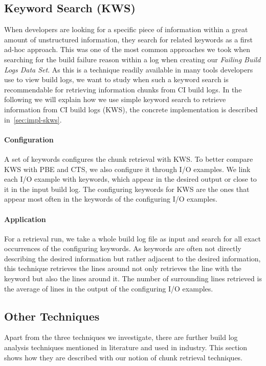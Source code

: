 \documentclass[\myrootdir/main.tex]{subfiles}
\begin{document}
\subsection{Keyword Search (KWS)}
\label{sec:expl-skws}
When developers are looking for a specific piece of information within a great amount of unstructured information, they search for related keywords as a first ad-hoc approach.
This was one of the most common approaches we took when searching for the build failure reason within a log when creating our \emph{Failing Build Logs Data Set}.
As this is a technique readily available in many tools developers use to view build logs, we want to study when such a keyword search is recommendable for retrieving information chunks from CI build logs.
In the following we will explain how we use simple keyword search to retrieve information from CI build logs (KWS), the concrete implementation is described in~\ref{sec:impl-skws}.

\paragraph{Configuration}
A set of keywords configures the chunk retrieval with KWS.
To better compare KWS with PBE and CTS, we also configure it through I/O examples.
We link each I/O example with keywords, which appear in the desired output or close to it in the input build log.
The configuring keywords for KWS are the ones that appear most often in the keywords of the configuring I/O examples.

\paragraph{Application}
For a retrieval run, we take a whole build log file as input and search for all exact occurrences of the configuring keywords.
As keywords are often not directly describing the desired information but rather adjacent to the desired information, this technique retrieves the lines around not only retrieves the line with the keyword but also the lines around it.
The number of surrounding lines retrieved is the average of lines in the output of the configuring I/O examples.

\subsection{Other Techniques}
\label{sec:expl-rlr}
Apart from the three techniques we investigate, there are further build log analysis techniques mentioned in literature and used in industry.
This section shows how they are described with our notion of chunk retrieval techniques.
\end{document}
